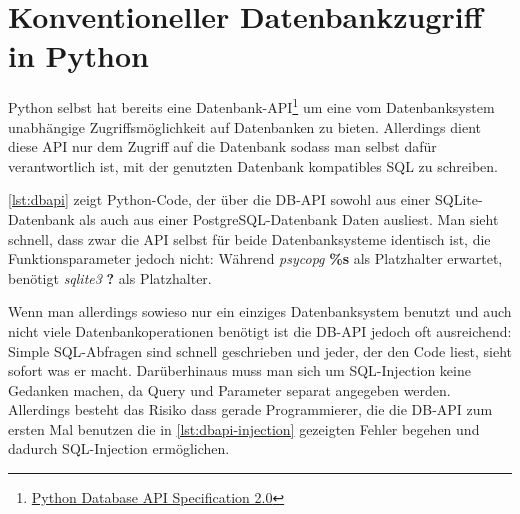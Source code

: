 \section{Konventioneller Datenbankzugriff in Python}

Python selbst hat bereits eine
Datenbank-API\footnote{\href{http://www.python.org/dev/peps/pep-0249/}{Python
Database API Specification 2.0}} um eine vom Datenbanksystem unabhängige
Zugriffsmöglichkeit auf Datenbanken zu bieten.
Allerdings dient diese API nur dem Zugriff auf die Datenbank sodass man selbst
dafür verantwortlich ist, mit der genutzten Datenbank kompatibles SQL zu
schreiben.

\autoref{lst:dbapi} zeigt Python-Code, der über die DB-API sowohl aus
einer SQLite-Datenbank als auch aus einer PostgreSQL-Datenbank Daten ausliest.
Man sieht schnell, dass zwar die API selbst für beide Datenbanksysteme identisch
ist, die Funktionsparameter jedoch nicht: Während \emph{psycopg} \textbf{\%s}
als Platzhalter erwartet, benötigt \emph{sqlite3} \textbf{?} als Platzhalter.



Wenn man allerdings sowieso nur ein einziges Datenbanksystem benutzt und auch
nicht viele Datenbankoperationen benötigt ist die DB-API jedoch oft ausreichend:
Simple SQL-Abfragen sind schnell geschrieben und jeder, der den Code liest,
sieht sofort was er macht. Darüberhinaus muss man sich um SQL-Injection keine
Gedanken machen, da Query und Parameter separat angegeben werden. Allerdings
besteht das Risiko dass gerade Programmierer, die die DB-API zum ersten Mal
benutzen die in \autoref{lst:dbapi-injection} gezeigten Fehler begehen und
dadurch SQL-Injection ermöglichen.


